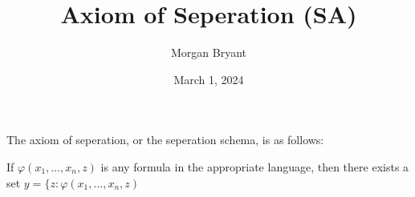 \documentclass[a4paper]{article}
\title{Axiom of Seperation (SA)}
\date{March 1, 2024}
\author{Morgan Bryant}
\begin{document}
\maketitle
\par{The axiom of seperation, or the seperation schema, is as follows:}\par{If \(\varphi (x_1, \dots , x_n,z)\) is any formula in the appropriate language, then there exists a set \( y =  \{ z:  \varphi (x_1, \dots , x_n, z)\)}
\printbibliography
\end{document}
